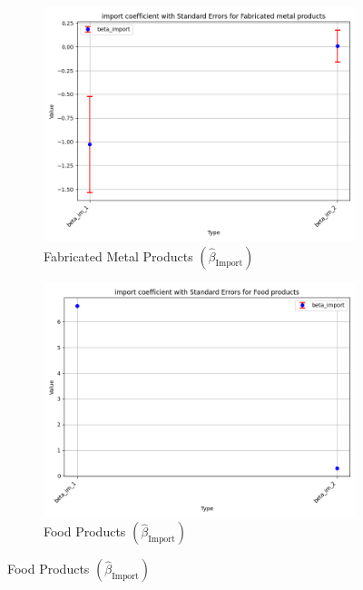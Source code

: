 \documentclass{article}
\begin{document}
\begin{figure}[ht!]
    \begin{subfigure}[t]{0.32\textwidth}
        \centering
        \includegraphics[width=\textwidth]{figure/empirical_ar1_mixture_kmshare_ciiu_beta_import_with_error_bars_Fabricated metal products.png}
        \caption{Fabricated Metal Products $(\hat{\beta}_{\text{Import}})$}
    \end{subfigure}
    \begin{subfigure}[t]{0.32\textwidth}
        \centering
        \includegraphics[width=\textwidth]{figure/empirical_ar1_mixture_kmshare_ciiu_beta_import_with_error_bars_Food products.png}
        \caption{Food Products $(\hat{\beta}_{\text{Import}})$}
    \end{subfigure}

\end{figure}
\end{document}
